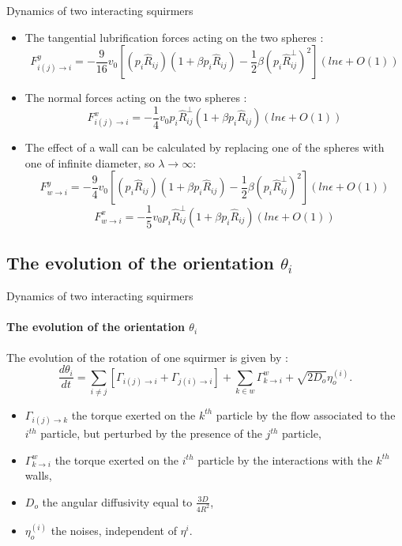 \documentclass{beamer}
\begin{document}
\begin{frame}{Dynamics of two interacting squirmers}
    \begin{itemize}
        \item The tangential lubrification forces acting on the two spheres : \begin{equation*}
            \boxed{
F_{i(j)\rightarrow i}^{y} = -\frac{9}{16}v_0
\left[(p_i\hat{R}_{ij})(1 + \beta p_i\hat{R}_{ij}) - \frac{1}{2}\beta(p_i\hat{R}^{\perp}_{ij})^2\right](ln \epsilon + O(1))
}
\end{equation*}
    \item The normal forces acting on the two spheres :
    \begin{equation*}
\boxed{F_{i(j)\rightarrow i}^{x} = -\frac{1}{4}v_0p_i\hat{R}^{\perp}_{ij}(1 + \beta p_i\hat{R}_{ij})(ln \epsilon + O(1))}
\end{equation*}
    \item The effect of a wall can be calculated by replacing one of the spheres with one of infinite diameter, so $\lambda\rightarrow\infty$:
    \begin{equation*}
        \boxed{F_{w\rightarrow i}^{y} = -\frac{9}{4} v_0
        \left[(p_i\hat{R}_{ij})(1 + \beta p_i\hat{R}_{ij}) - \frac{1}{2}\beta(p_i\hat{R}^{\perp}_{ij})^2\right](ln \epsilon + O(1))}
    \end{equation*}
    \begin{equation*}
        \boxed{F_{w\rightarrow i}^{x} = -\frac{1}{5} v_0p_i\hat{R}^{\perp}_{ij}(1 + \beta p_i\hat{R}_{ij})(ln \epsilon + O(1))}
    \end{equation*}
    \end{itemize}
\end{frame}
    
\subsection{The evolution of the orientation $\theta _i$}
\begin{frame}{Dynamics of two interacting squirmers}
        \framesubtitle{The evolution of the orientation $\theta _i$}
    The evolution of the rotation of one squirmer is given by : 
    $$
    \frac{d \theta_i}{dt} = \sum\limits_{i\ne j} \left[\Gamma_{i(j)\rightarrow i} + \Gamma_{j(i)\rightarrow i}\right] + \sum\limits_{k\in w} \Gamma_{k\rightarrow i}^w + \sqrt{2D_o} \eta_o^{(i)}.
    $$ 
    \begin{itemize}
        \item $\Gamma_{i(j)\rightarrow k}$ the torque exerted on the $k^{th}$ particle by the flow associated to the $i^{th}$ particle, but perturbed by the presence of the $j^{th}$ particle,
        \item $\Gamma_{k\rightarrow i}^w$ the torque exerted on the $i^{th}$ particle by the interactions with the $k^{th}$ walls,
        \item $D_o$ the angular diffusivity equal to $\frac{3D}{4R^2}$,
        \item $\eta_o^{(i)}$ the noises, independent of $\eta^{i}$.
    \end{itemize}
\end{frame}
\end{document}
